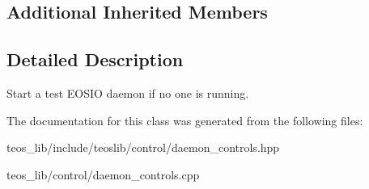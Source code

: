 \subsection*{Additional Inherited Members}


\subsection{Detailed Description}
Start a test E\+O\+S\+IO daemon if no one is running. 

The documentation for this class was generated from the following files\+:\begin{DoxyCompactItemize}
\item 
teos\+\_\+lib/include/teoslib/control/daemon\+\_\+controls.\+hpp\item 
teos\+\_\+lib/control/daemon\+\_\+controls.\+cpp\end{DoxyCompactItemize}
